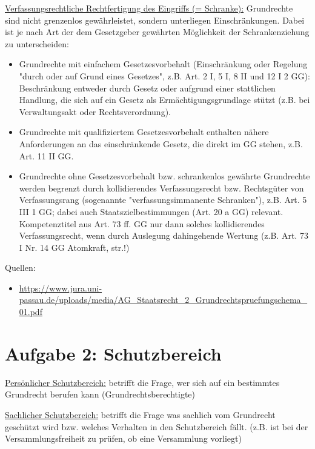 \documentclass{article}
\begin{document}
	\underline{Verfassungsrechtliche Rechtfertigung des Eingriffs (= Schranke):} Grundrechte sind nicht grenzenlos gewähr\-leistet, sondern unterliegen Einschränkungen. Dabei ist je nach Art der dem Gesetzgeber gewährten Möglichkeit der Schrankenziehung zu unterscheiden:
	\begin{itemize}
		\item Grundrechte mit einfachem Gesetzesvorbehalt (Einschränkung oder Regelung "durch oder auf Grund eines Gesetzes", z.B. Art. 2 I, 5 I, 8 II und 12 I 2 GG): Beschränkung entweder durch Gesetz oder aufgrund einer stattlichen Handlung, die sich auf ein Gesetz als Ermächtigungsgrundlage stützt (z.B. bei Verwaltungsakt oder Rechtsverordnung).
		\item Grundrechte mit qualifiziertem Gesetzesvorbehalt enthalten nähere Anforderungen an das einschränk\-ende Gesetz, die direkt im GG stehen, z.B. Art. 11 II GG. 
		\item Grundrechte ohne Gesetzesvorbehalt bzw. schrankenlos gewährte Grundrechte werden begrenzt durch kollidierendes Verfassungsrecht bzw. Rechtsgüter von Verfassungsrang (sogenannte "verfassungsimmanente Schranken"), z.B. Art. 5 III 1 GG; dabei auch Staatszielbestimmungen (Art. 20 a GG) relevant. Kompetenztitel aus Art. 73 ff. GG nur dann solches kollidierendes Verfassungsrecht, wenn durch Auslegung dahingehende Wertung (z.B. Art. 73 I Nr. 14 GG Atomkraft, str.!)
	\end{itemize}

	Quellen:
	\begin{itemize}
		\item \url{https://www.jura.uni-passau.de/uploads/media/AG_Staatsrecht_2_Grundrechtspruefungschema_01.pdf}
	\end{itemize}

	\section*{Aufgabe 2: Schutzbereich}
	\underline{Persönlicher Schutzbereich:} betrifft die Frage, wer sich auf ein bestimmtes Grundrecht berufen kann (Grundrechtsberechtigte)
	
	\underline{Sachlicher Schutzbereich:} betrifft die Frage was sachlich vom Grundrecht geschützt wird bzw. welches Verhalten in den Schutzbereich fällt. (z.B. ist bei der Versammlungsfreiheit zu prüfen, ob eine Versammlung vorliegt)
\end{document}
